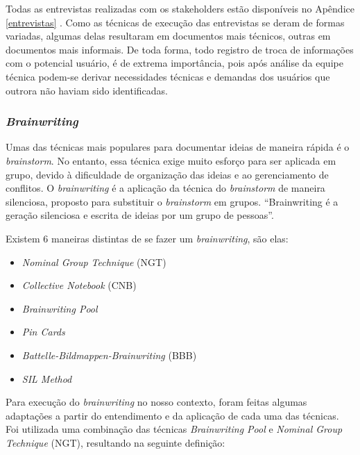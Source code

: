 Todas as entrevistas realizadas com os stakeholders estão disponíveis no Apêndice \ref{entrevistas} . Como as técnicas de execução das entrevistas se deram de formas variadas, algumas delas resultaram em documentos mais técnicos, outras em documentos mais informais. De toda forma, todo registro de troca de informações com o potencial usuário, é de extrema importância, pois após análise da equipe técnica podem-se derivar necessidades técnicas e demandas dos usuários que outrora não haviam sido identificadas.

\subsubsection{\textit{Brainwriting}}

\par Umas das técnicas mais populares para documentar ideias de maneira rápida é o \textit{brainstorm}. No entanto, essa técnica exige muito esforço para ser aplicada em grupo, devido à dificuldade de organização das ideias e ao gerenciamento de conflitos. O \textit{brainwriting} é a aplicação da técnica do \textit{brainstorm} de maneira silenciosa, proposto para substituir o \textit{brainstorm} em grupos. “Brainwriting é a geração silenciosa e escrita de ideias por um grupo de pessoas”. \cite{vangundy1984brain}

\par Existem 6 maneiras distintas de se fazer um \textit{brainwriting}, são elas:

\begin{itemize}
\item \textit{Nominal Group Technique} (NGT)
\item \textit{Collective Notebook} (CNB)
\item \textit{Brainwriting Pool}
\item \textit{Pin Cards}
\item \textit{Battelle-Bildmappen-Brainwriting} (BBB)
\item \textit{SIL Method}
\end{itemize}

\par Para execução do \textit{brainwriting} no nosso contexto, foram feitas algumas adaptações a partir do entendimento e da aplicação de cada uma das técnicas. Foi utilizada uma combinação das técnicas \textit{Brainwriting Pool} e  \textit{Nominal Group Technique} (NGT), resultando na seguinte definição:

